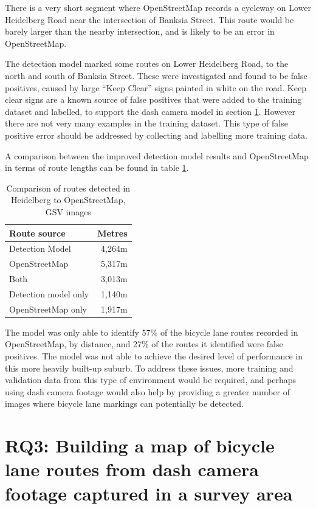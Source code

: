 \documentclass[11pt,twoside]{report}
\begin{document}
There is a very short segment where OpenStreetMap records a cycleway on Lower Heidelberg Road near the intersection of Banksia Street.  This route would be barely larger than the nearby intersection, and is likely to be an error in OpenStreetMap.

The detection model marked some routes on Lower Heidelberg Road, to the north and south of Banksia Street.  These were investigated and found to be false positives, caused by large ``Keep Clear'' signs painted in white on the road.  Keep clear signs are a known source of false positives that were added to the training dataset and labelled, to support the dash camera model in section \ref{results:rq3}.  However there are not very many examples in the training dataset.  This type of false positive error should be addressed by collecting and labelling more training data.

A comparison between the improved detection model results and OpenStreetMap in terms of route lengths can be found in table \ref{table_metres_rq2_h}.

\begin{table}[h]
\centering
\begin{tabular}{|l|r||}
\hline
\textbf{Route source} & \textbf{Metres} \\
\hline
Detection Model & 4,264m \\
OpenStreetMap & 5,317m \\
Both & 3,013m \\
Detection model only & 1,140m \\
OpenStreetMap only & 1,917m \\
\hline
\end{tabular}
\caption{Comparison of routes detected in Heidelberg to OpenStreetMap, GSV images}
\label{table_metres_rq2_h}
\end{table}

The model was only able to identify 57\% of the bicycle lane routes recorded in OpenStreetMap, by distance, and 27\% of the routes it identified were false positives.  The model was not able to achieve the desired level of performance in this more heavily built-up suburb.  To address  these issues, more training and validation data from this type of environment would be required, and perhaps using dash camera footage would also help by providing a greater number of images where bicycle lane markings can potentially be detected.

\section{RQ3: Building a map of bicycle lane routes from dash camera footage captured in a survey area}
\label{results:rq3}
\end{document}
